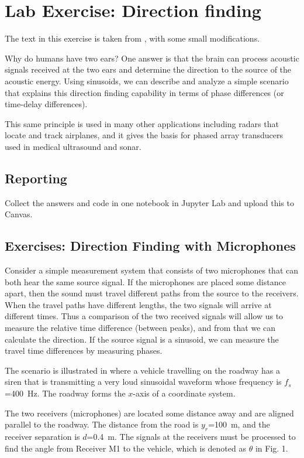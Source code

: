 \section{Lab Exercise: Direction finding}
The text in this exercise is taken from \cite{mcclellan_lab_2016}, with some small modifications.

Why do humans have two ears? One answer is that the brain can process acoustic signals received at the two ears and determine the direction to the source of the acoustic energy. Using sinusoids, we can describe and analyze a simple scenario that explains this direction finding capability in terms of phase differences (or time-delay differences). 

This same principle is used in many other applications including radars that locate and track airplanes, and it gives the basis for phased array transducers used in medical ultrasound and sonar.

\subsection*{Reporting}	
Collect the answers and code in one notebook in Jupyter Lab and upload this to Canvas.

\subsection{Exercises: Direction Finding with Microphones}
Consider a simple measurement system that consists of two microphones that can both hear the same source signal. If the microphones are placed some distance apart, then the sound must travel different paths from the source to the receivers. When the travel paths have different lengths, the two signals will arrive at different times. Thus a comparison of the two received signals will allow us to measure the relative time difference (between peaks), and from that we can calculate the direction. If the source signal is a sinusoid, we can measure the travel time differences by measuring phases.

The scenario is illustrated in  where a vehicle travelling on the roadway has a siren that is transmitting a very loud sinusoidal waveform whose frequency is $f_s$=\qty{400}{Hz}. The roadway forms the $x$-axis of a coordinate system.

The two receivers (microphones) are located some distance away and are aligned parallel to the roadway. The distance from the road is $y_r$=\qty{100}{m}, and the receiver separation is $d$=\qty{0.4}{m}. The signals at the receivers must be processed to find the angle from Receiver M1 to the vehicle, which is denoted as $\theta$ in Fig. 1.

